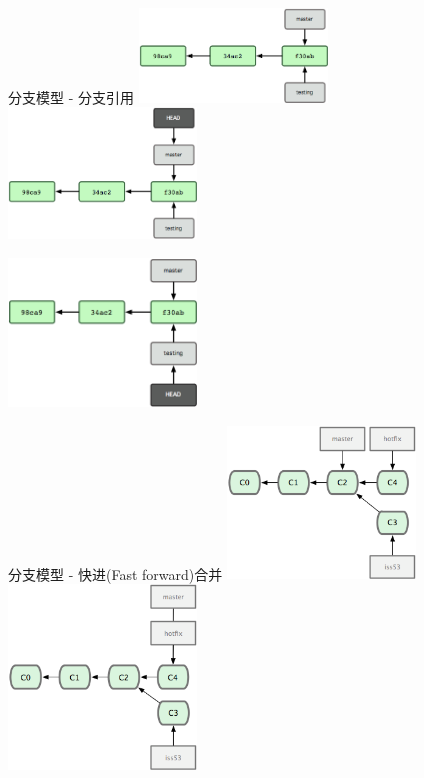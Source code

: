 \documentclass[CJK, 10pt]{beamer}
\begin{document}
\begin{CJK*}{UTF8}{gbsn}
\begin{frame}{分支模型 - 分支引用}
    \includegraphics[width=5cm]{branch-pointer.png} \hfill \includegraphics[width=5cm]{HEAD-point-current.png} \\
    \begin{center}
        \includegraphics[width=5cm]{HEAD-point-testing.png}
    \end{center}
\end{frame}

\begin{frame}{分支模型 - 快进(Fast forward)合并}
    \includegraphics[width=5cm]{hotfix-branch.png} \hfill \includegraphics[width=5cm]{master-hotfix-same.png}
\end{frame}


\end{CJK*}
\end{document}
